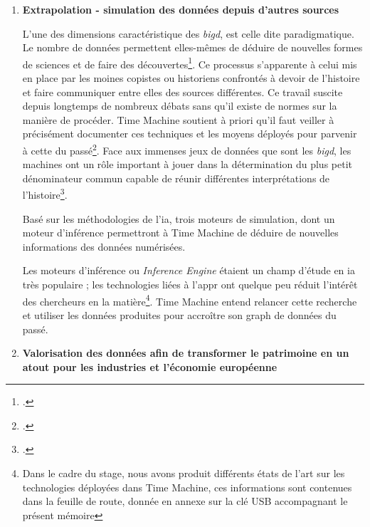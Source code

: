 \begin{enumerate}
Les différentes technologies déployées dans le cadre de ces deux projets seront amenées à enrichir les futurs composants de la Time Machine. Il n'existe actuellement qu'un nombre limité d'applications d'\gls{appr} pour le traitement des données culturelles et patrimoniales. Time Machine entend développer un réseau de chercheurs et de projets visant à améliorer cet existant\footnote{Dans le cadre du stage, nous avons produit différents états de l'art sur les technologies déployées dans Time Machine, ces informations sont contenues dans la feuille de route, figurant sur la clé USB accompagnant ce mémoire.}.
\begin{figure}[H]%
\centering
\texttt{[image: impresso.jpg]}
\caption{Impresso, visuel \textit{© Copyright 2019 EPFL, DHLAB}}
\end{figure}
\item \textbf{Extrapolation - simulation des données depuis d'autres sources} 

L'une des dimensions caractéristique des \textit{\gls{bigd}}, est celle dite paradigmatique. Le nombre de données permettent elles-mêmes de déduire de nouvelles formes de sciences et de faire des découvertes\footcite{kaplan_big_2017}. Ce processus s'apparente à celui mis en place par les moines copistes ou historiens confrontés à devoir  de l'histoire et faire communiquer entre elles des sources différentes. Ce travail suscite depuis longtemps de nombreux débats sans qu'il existe de normes sur la manière de procéder. Time Machine soutient à priori qu'il faut veiller à précisément documenter ces techniques et les moyens déployés pour parvenir à cette  du passé\footcite{kaplan_big_2017}. Face aux immenses jeux de données que sont les \textit{\gls{bigd}}, les machines ont un rôle important à jouer dans la détermination du plus petit dénominateur commun capable de réunir différentes interprétations de l'histoire\footcite{kaplan_big_2017}.

Basé sur les méthodologies de l'\gls{ia}, trois moteurs de simulation, dont un moteur d'inférence permettront à Time Machine de déduire de nouvelles informations des données numérisées.

Les moteurs d'inférence ou \textit{Inference Engine} étaient un champ d'étude en \gls{ia} très populaire ; les technologies liées à l'\gls{appr} ont quelque peu réduit l'intérêt des chercheurs en la matière\footnote{Dans le cadre du stage, nous avons produit différents états de l'art sur les technologies déployées dans Time Machine, ces informations sont contenues dans la feuille de route, donnée en annexe sur la clé USB accompagnant le présent mémoire}. Time Machine entend relancer cette recherche et utiliser les données produites pour accroître son \gls{graph} de données du passé.
\item \textbf{Valorisation des données afin de transformer le patrimoine en un atout pour les industries et l'économie européenne}


\end{enumerate}
